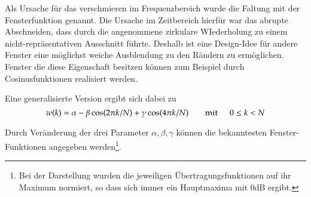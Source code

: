 Als Ursache für das verschmieren im Frequenzbereich wurde die
Faltung mit der Fensterfunktion genannt. Die Ursache im
Zeitbereich hierfür war das abrupte Abschneiden, dass durch die
angenommene zirkulare WIederholung zu einem nicht-repräsentativen
Ausschnitt führte. Deshalb ist eine Design-Idee für andere Fenster
eine möglichst weiche Ausblendung zu den Rändern zu ermöglichen.
Fenster die diese Eigenschaft besitzen können zum Beispiel durch
Cosinusfunktionen realisiert werden.

Eine generalisierte Version ergibt sich dabei zu
\begin{equation}\label{eq:WindowFunction:General}
   w(k) = \alpha - \beta \cos(2\pi k /N) + \gamma \cos(4\pi k /N) \quad \quad\mathrm{mit}\;\, \quad 0\leq k
   < N
\end{equation}

Durch Veränderung der drei Parameter $\alpha, \beta, \gamma$
können die bekanntesten Fenster-Funktionen angegeben
werden\footnote{Bei der Darstellung wurden die jeweiligen
Übertragungsfunktionen auf ihr Maximum normiert, so dass sich
immer ein Hauptmaxima mit 0dB ergibt.}.

